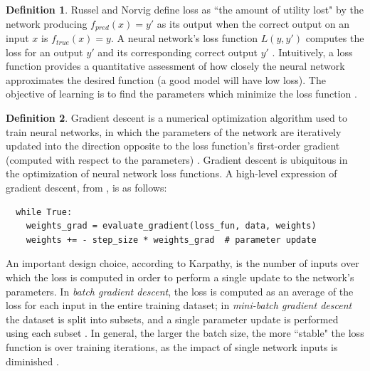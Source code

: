 \documentclass[12pt, titlepage]{report}
\theoremstyle{definition}
\newtheorem{definition}{Definition}
\begin{document}
\begin{definition}
Russel and Norvig define loss as ``the amount of utility lost" by the network producing $f_{pred}(x) = y'$ as its output when the correct output on an input $x$ is $f_{true}(x) = y$. A neural network's loss function $L(y, y')$ computes the loss for an output $y'$ and its corresponding correct output $y'$ \cite{russel2009artificial}. Intuitively, a loss function provides a quantitative assessment of how closely the neural network approximates the desired function (a good model will have low loss). The objective of learning is to find the parameters which minimize the loss function \cite[Linear classification: Support Vector Machine, Softmax]{karpathy2017cs231n}.
\end{definition}

\begin{definition}
Gradient descent is a numerical optimization algorithm used to train neural networks, in which the parameters of the network are iteratively updated into the direction opposite to the loss function's first-order gradient (computed with respect to the parameters) \cite[Optimization: Stochastic Gradient Descent]{karpathy2017cs231n}. Gradient descent is ubiquitous in the optimization of neural network loss functions. A high-level expression of gradient descent, from \cite{karpathy2017cs231n}, is as follows:

\begin{verbatim}
  while True:
    weights_grad = evaluate_gradient(loss_fun, data, weights)
    weights += - step_size * weights_grad  # parameter update
\end{verbatim}
\end{definition}

An important design choice, according to Karpathy, is the number of inputs over which the loss is computed in order to perform a single update to the network's parameters. In \emph{batch gradient descent}, the loss is computed as an average of the loss for each input in the entire training dataset; in \emph{mini-batch gradient descent} the dataset is split into subsets, and a single parameter update is performed using each subset \cite[Optimization: Stochastic Gradient Descent]{karpathy2017cs231n}. In general, the larger the batch size, the more ``stable" the loss function is over training iterations, as the impact of single network inputs is diminished \cite[Neural Networks Part 3: Learning and Evaluation]{karpathy2017cs231n}. 
\end{document}
